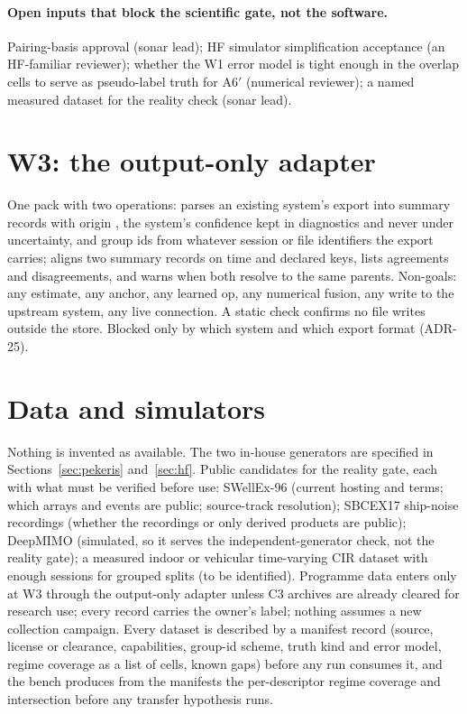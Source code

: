 \documentclass[11pt,a4paper]{article}
\begin{document}
\paragraph{Open inputs that block the scientific gate, not the software.} Pairing-basis approval (sonar lead); HF simulator simplification acceptance (an HF-familiar reviewer); whether the W1 error model is tight enough in the overlap cells to serve as pseudo-label truth for A6$'$ (numerical reviewer); a named measured dataset for the reality check (sonar lead).

\section{W3: the output-only adapter}

One pack with two operations:  parses an existing system's export into summary records with origin , the system's confidence kept in diagnostics and never under uncertainty, and group ids from whatever session or file identifiers the export carries;  aligns two summary records on time and declared keys, lists agreements and disagreements, and warns when both resolve to the same parents. Non-goals: any estimate, any anchor, any learned op, any numerical fusion, any write to the upstream system, any live connection. A static check confirms no file writes outside the store. Blocked only by which system and which export format (ADR-25).

\section{Data and simulators}

Nothing is invented as available. The two in-house generators are specified in Sections~\ref{sec:pekeris} and~\ref{sec:hf}. Public candidates for the reality gate, each with what must be verified before use: SWellEx-96 (current hosting and terms; which arrays and events are public; source-track resolution); SBCEX17 ship-noise recordings (whether the recordings or only derived products are public); DeepMIMO (simulated, so it serves the independent-generator check, not the reality gate); a measured indoor or vehicular time-varying CIR dataset with enough sessions for grouped splits (to be identified). Programme data enters only at W3 through the output-only adapter unless C3 archives are already cleared for research use; every record carries the owner's  label; nothing assumes a new collection campaign. Every dataset is described by a manifest record (source, license or clearance, capabilities, group-id scheme, truth kind and error model, regime coverage as a list of cells, known gaps) before any run consumes it, and the bench produces from the manifests the per-descriptor regime coverage and intersection before any transfer hypothesis runs.
\end{document}
